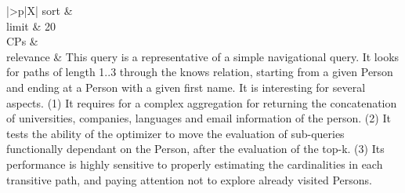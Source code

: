 \begin{tabularx}{\queryCardWidth}{|>{\queryPropertyCell}p{\queryPropertyCellWidth}|X|}
		sort		&
		\innerCardVSpace \\ \hline
	limit & 20 \\ \hline
	CPs &
	 \\ \hline
	relevance &
		\footnotesize This query is a representative of a simple navigational query. It looks for paths of length 1..3 through
the knows relation, starting from a given Person and ending at a Person with a given first name. It is interesting for several
aspects. (1) It requires for a complex aggregation for returning the concatenation of universities, companies,
languages and email information of the person. (2) It tests the ability of the optimizer to move the evaluation of
sub-queries functionally dependant on the Person, after the evaluation of the top-k. (3) Its performance is
highly sensitive to properly estimating the cardinalities in each transitive path, and paying attention not to explore
already visited Persons.
 \\ \hline%
\end{tabularx}
\queryCardVSpace

\let\emph\oldemph